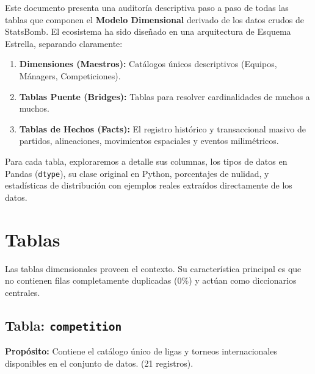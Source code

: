 \documentclass[12pt,a4paper]{article}
\begin{document}
Este documento presenta una auditoría descriptiva paso a paso de todas las tablas que componen el \textbf{Modelo Dimensional} derivado de los datos crudos de StatsBomb. El ecosistema ha sido diseñado en una arquitectura de Esquema Estrella, separando claramente:

\begin{enumerate}
    \item \textbf{Dimensiones (Maestros):} Catálogos únicos descriptivos (Equipos, Mánagers, Competiciones).
    \item \textbf{Tablas Puente (Bridges):} Tablas para resolver cardinalidades de muchos a muchos.
    \item \textbf{Tablas de Hechos (Facts):} El registro histórico y transaccional masivo de partidos, alineaciones, movimientos espaciales y eventos milimétricos.
\end{enumerate}

Para cada tabla, exploraremos a detalle sus columnas, los tipos de datos en Pandas (\texttt{dtype}), su clase original en Python, porcentajes de nulidad, y estadísticas de distribución con ejemplos reales extraídos directamente de los datos.

\section{Tablas}

Las tablas dimensionales proveen el contexto. Su característica principal es que no contienen filas completamente duplicadas (0\%) y actúan como diccionarios centrales.
\subsection{Tabla: \texttt{competition}}

\textbf{Propósito:} Contiene el catálogo único de ligas y torneos internacionales disponibles en el conjunto de datos. (21 registros).
\end{document}

